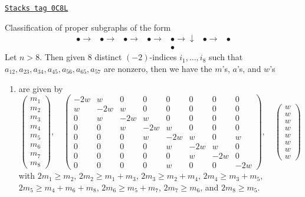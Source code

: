 \begin{lemma}[E8]
\label{models-lemma-E8}
\href{https://stacks.math.columbia.edu/tag/0C8L}{\texttt{Stacks tag 0C8L}}

Classification of proper subgraphs of the form
$$
\begin{array}{ccccccc}\bullet \longrightarrow & \bullet \longrightarrow & \bullet \longrightarrow & \bullet \longrightarrow & \bullet \longrightarrow\downarrow & \bullet \longrightarrow & \bullet \\  &  &  &  & \bullet &  & \end{array}
$$
Let $n > 8$. Then given $8$ distinct $(-2)$-indices $i_1, \ldots, i_8$
such that $a_{12}, a_{23}, a_{34}, a_{45}, a_{56}, a_{65}, a_{57}$
are nonzero, then we have the $m$'s, $a$'s, and $w$'s
\begin{enumerate}
\item
\label{models-item-E8}
are given by
$$
\left(
\begin{matrix}
m_1 \\
m_2 \\
m_3 \\
m_4 \\
m_5 \\
m_6 \\
m_7 \\
m_8
\end{matrix}
\right),
\quad
\left(
\begin{matrix}
-2w & w & 0 & 0 & 0 & 0 & 0 & 0 \\
w & -2w & w & 0 & 0 & 0 & 0 & 0 \\
0 & w & -2w & w & 0 & 0 & 0 & 0 \\
0 & 0 & w & -2w & w & 0 & 0 & 0 \\
0 & 0 & 0 & w & -2w & w & 0 & w \\
0 & 0 & 0 & 0 & w & -2w & w & 0 \\
0 & 0 & 0 & 0 & 0 & w & -2w & 0 \\
0 & 0 & 0 & 0 & w & 0 & 0 & -2w
\end{matrix}
\right),
\quad
\left(
\begin{matrix}
w \\
w \\
w \\
w \\
w \\
w \\
w \\
w
\end{matrix}
\right)
$$
with $2m_1 \geq m_2$, $2m_2 \geq m_1 + m_3$, $2m_3 \geq m_2 + m_4$,
$2m_4 \geq m_3 + m_5$, $2m_5 \geq m_4 + m_6 + m_8$, $2m_6 \geq m_5 + m_7$,
$2m_7 \geq m_6$, and $2m_8 \geq m_5$.
\end{enumerate}
\end{lemma}

